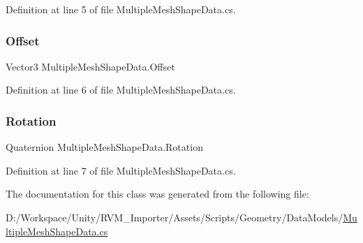 Definition at line 5 of file Multiple\+Mesh\+Shape\+Data.\+cs.

\mbox{\label{class_multiple_mesh_shape_data_a0b948060fcca07176b1083c3db30c2b6}} 
\subsubsection{\texorpdfstring{Offset}{Offset}}
{\footnotesize\ttfamily Vector3 Multiple\+Mesh\+Shape\+Data.\+Offset}



Definition at line 6 of file Multiple\+Mesh\+Shape\+Data.\+cs.

\mbox{\label{class_multiple_mesh_shape_data_a102a4edea562cc4e7527df92911e0e57}} 
\subsubsection{\texorpdfstring{Rotation}{Rotation}}
{\footnotesize\ttfamily Quaternion Multiple\+Mesh\+Shape\+Data.\+Rotation}



Definition at line 7 of file Multiple\+Mesh\+Shape\+Data.\+cs.



The documentation for this class was generated from the following file\+:\begin{DoxyCompactItemize}
\item 
D\+:/\+Workspace/\+Unity/\+R\+V\+M\+\_\+\+Importer/\+Assets/\+Scripts/\+Geometry/\+Data\+Models/\mbox{\hyperlink{_multiple_mesh_shape_data_8cs}{Multiple\+Mesh\+Shape\+Data.\+cs}}\end{DoxyCompactItemize}
